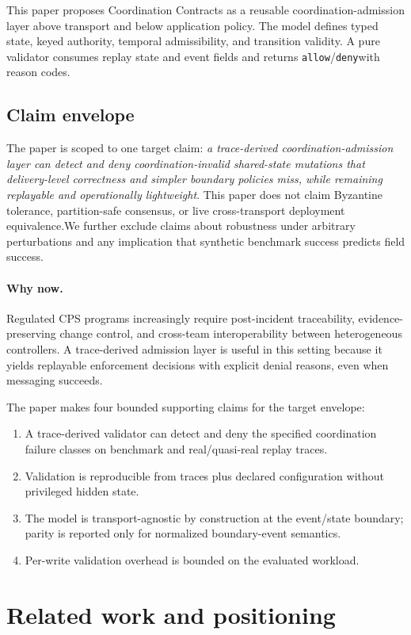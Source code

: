 \documentclass[11pt]{article}
\newcommand{\allow}{\texttt{allow}}
\newcommand{\deny}{\texttt{deny}}
\newcommand{\nongoals}{This paper does not claim Byzantine tolerance, partition-safe consensus, or live cross-transport deployment equivalence.}
\begin{document}
This paper proposes Coordination Contracts as a reusable coordination-admission layer above transport and below application policy. The model defines typed state, keyed authority, temporal admissibility, and transition validity. A pure validator consumes replay state and event fields and returns \allow/\deny with reason codes.

\subsection*{Claim envelope}
The paper is scoped to one target claim: \emph{a trace-derived coordination-admission layer can detect and deny coordination-invalid shared-state mutations that delivery-level correctness and simpler boundary policies miss, while remaining replayable and operationally lightweight}. \nongoals We further exclude claims about robustness under arbitrary perturbations and any implication that synthetic benchmark success predicts field success.

\paragraph{Why now.}
Regulated CPS programs increasingly require post-incident traceability, evidence-preserving change control, and cross-team interoperability between heterogeneous controllers. A trace-derived admission layer is useful in this setting because it yields replayable enforcement decisions with explicit denial reasons, even when messaging succeeds.

The paper makes four bounded supporting claims for the target envelope:
\begin{enumerate}[leftmargin=1.5em]
\item A trace-derived validator can detect and deny the specified coordination failure classes on benchmark and real/quasi-real replay traces.
\item Validation is reproducible from traces plus declared configuration without privileged hidden state.
\item The model is transport-agnostic by construction at the event/state boundary; parity is reported only for normalized boundary-event semantics.
\item Per-write validation overhead is bounded on the evaluated workload.
\end{enumerate}

\section{Related work and positioning}
\end{document}
